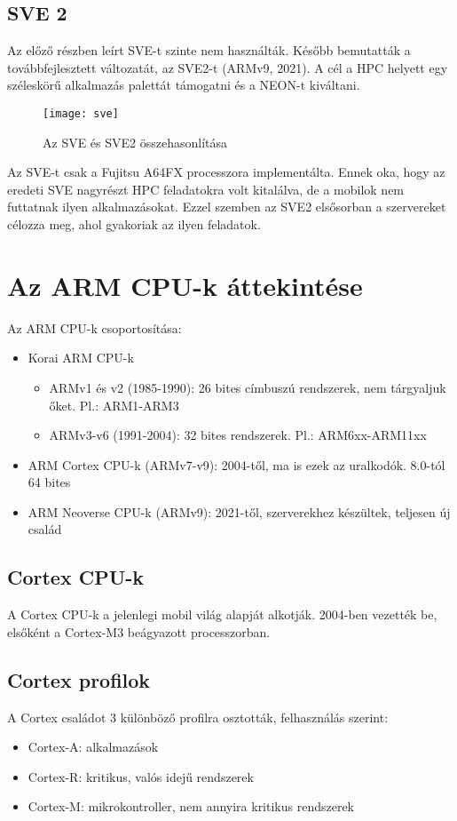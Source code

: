 \subsection{SVE 2}
Az előző részben leírt SVE-t szinte nem használták.
Később bemutatták a továbbfejlesztett változatát, az SVE2-t (ARMv9, 2021).
A cél a HPC helyett egy széleskörű alkalmazás palettát támogatni és a NEON-t kiváltani.
\begin{figure}[H]
    \texttt{[image: sve]}
    \centering
    \caption{Az SVE és SVE2 összehasonlítása}
    \label{fig:sve}
\end{figure}
Az SVE-t csak a Fujitsu A64FX processzora implementálta.
Ennek oka, hogy az eredeti SVE nagyrészt HPC feladatokra volt kitalálva, de a mobilok nem futtatnak ilyen alkalmazásokat.
Ezzel szemben az SVE2 elsősorban a szervereket célozza meg, ahol gyakoriak az ilyen feladatok.

\section{Az ARM CPU-k áttekintése}
Az ARM CPU-k csoportosítása:
\begin{itemize}
    \item Korai ARM CPU-k
    \begin{itemize}
        \item ARMv1 és v2 (1985-1990): 26 bites címbuszú rendszerek, nem tárgyaljuk őket. Pl.: ARM1-ARM3
        \item ARMv3-v6 (1991-2004): 32 bites rendszerek. Pl.: ARM6xx-ARM11xx
    \end{itemize}
    \item ARM Cortex CPU-k (ARMv7-v9): 2004-től, ma is ezek az uralkodók. 8.0-tól 64 bites
    \item ARM Neoverse CPU-k (ARMv9): 2021-től, szerverekhez készültek, teljesen új család
\end{itemize}

\subsection{Cortex CPU-k}
A Cortex CPU-k a jelenlegi mobil világ alapját alkotják.
2004-ben vezették be, elsőként a Cortex-M3 beágyazott processzorban.

\subsection{Cortex profilok}
A Cortex családot 3 különböző profilra osztották, felhasználás szerint:
\begin{itemize}
    \item Cortex-A: alkalmazások
    \item Cortex-R: kritikus, valós idejű rendszerek
    \item Cortex-M: mikrokontroller, nem annyira kritikus rendszerek
\end{itemize}

